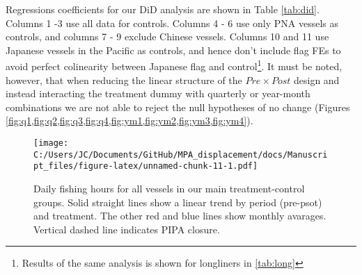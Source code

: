 \documentclass[11pt,]{article}
\let\rmarkdownfootnote\footnote%
\def\footnote{\protect\rmarkdownfootnote}
\begin{document}
Regressions coefficients for our DiD analysis are shown in Table
\ref{tab:did}. Columns 1 -3 use all data for controls. Columns 4 - 6 use
only PNA vessels as controls, and columns 7 - 9 exclude Chinese vessels.
Columns 10 and 11 use Japanese vessels in the Pacific as controls, and
hence don't include flag FEs to avoid perfect colinearity between
Japanese flag and
control\footnote{Results of the same analysis is shown for longliners in \ref{tab:long}}.
It must be noted, however, that when reducing the linear structure of
the \(Pre \times Post\) design and instead interacting the treatment
dummy with quarterly or year-month combinations we are not able to
reject the null hypotheses of no change (Figures
\ref{fig:q1,fig:q2,fig:q3,fig:q4,fig:ym1,fig:ym2,fig:ym3,fig:ym4}).

\begin{figure}
\centering
\texttt{[image: C:/Users/JC/Documents/GitHub/MPA\_displacement/docs/Manuscript\_files/figure-latex/unnamed-chunk-11-1.pdf]}
\caption{\label{fig:unnamed-chunk-11}\label{fig:all_vessels}Daily fishing
hours for all vessels in our main treatment-control groups. Solid
straight lines show a linear trend by period (pre-psot) and treatment.
The other red and blue lines show monthly avarages. Vertical dashed line
indicates PIPA closure.}
\end{figure}
\end{document}
